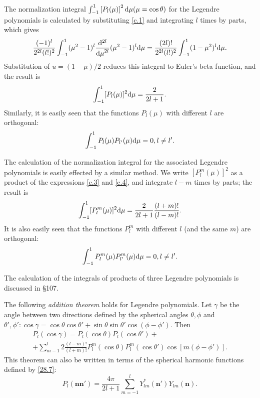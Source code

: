 The normalization integral $ \int_{-1}^{1}\left[P_l(\mu) \right]^2\mathrm{d}\mu (\mu=\cos \theta)$ for the Legendre polynomials is calculated by substituting \eqref{c.1} and integrating $ l $ times by parts, which gives
\[ \frac{(-1)^l}{2^{2l}(l!)^2}\int_{-1}^{1}(\mu^2-1)^l\frac{\mathrm{d}^{2l}}{{\mathrm{d}\mu}^{2l}}(\mu^2-1)^l\mathrm{d}\mu=\frac{(2l)!}{2^{2l}(l!)^2}\int_{-1}^{1}(1-\mu^2)^l\mathrm{d}\mu. \]
Substitution of $ u = (1 − \mu)/2 $ reduces this integral to Euler’s beta function, and the result is
\begin{equation}\label{c.6}
\int_{-1}^{1}[P_l(\mu)]^2\mathrm{d}\mu=\frac{2}{2l+1}.
\end{equation}
Similarly, it is easily seen that the functions $ P_l(\mu) $ with different $ l $ are orthogonal:
\begin{equation}\label{c.7}
\int_{-1}^{1}P_l(\mu)P_{l'}(\mu)\mathrm{d}\mu=0,l\ne l'.
\end{equation}



The calculation of the normalization integral for the associated Legendre polynomials is easily effected by a similar method. We write $ [P_l^m(\mu)]^2 $ as a product of the expressions \eqref{c.3} and \eqref{c.4}, and integrate $ l − m $ times by parts; the result is
\begin{equation}\label{c.8}
\int_{-1}^{1}[P_l^m(\mu)]^2\mathrm{d}\mu=\frac{2}{2l+1}\frac{(l+m)!}{(l-m)!}.
\end{equation}
It is also easily seen that the functions $ P_l^m $ with different $ l $ (and the same $ m $) are orthogonal:
\begin{equation}\label{c.9}
\int_{-1}^{1}P_l^m(\mu)P_{l'}^m(\mu)\mathrm{d}\mu=0,l\ne l'.
\end{equation}



The calculation of the integrals of products of three Legendre polynomials is discussed in \S107.

The following \textit{addition theorem} holds for Legendre polynomials. Let $\gamma$ be the angle between two directions defined by the spherical angles $ \theta, \phi $ and $ \theta', \phi': \cos \gamma = \cos \theta \cos \theta' + \sin \theta \sin \theta' \cos (\phi - \phi')$. Then
\begin{multline}\label{c.10}
P_l(\cos\gamma)=P_l(\cos\theta)P_l(\cos\theta')+\\
+\sum_{m-1}^{l}2\frac{(l-m)!}{(l+m)!}P_l^m(\cos\theta)P_l^m(\cos\theta')\cos[m(\phi-\phi')].
\end{multline}
This theorem can also be written in terms of the spherical harmonic functions defined by \eqref{28.7}:
\begin{equation}\label{c.11}
P_l(\bm{nn'})=\frac{4\pi}{2l+1}\sum_{m=-1}^l Y_{lm}^*(\bm{n'})Y_{lm}(\bm{n}).
\end{equation}



